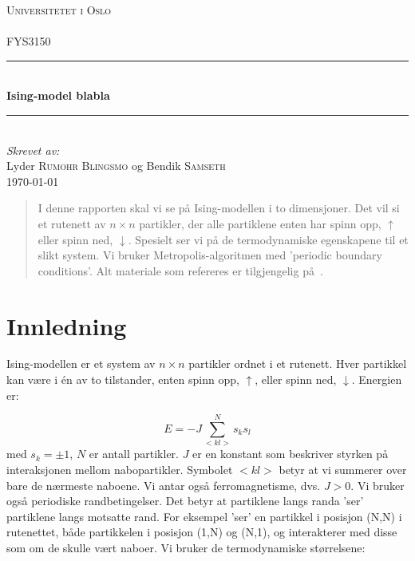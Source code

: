 \documentclass[11pt]{article}
\begin{document}
\begin{titlepage}
  \newcommand{\HRule}{\rule{\linewidth}{0.5mm}}
  \center
  \textsc{\LARGE Universitetet i Oslo}\\[1.5cm] %
  \textsc{\Large }\\[0.5cm] %
  \textsc{\large FYS3150}\\[0.5cm] %
  \HRule \\[0.4cm]
  { \huge \bfseries Ising-model blabla}\\[0.4cm]
  \HRule \\[1.5cm]
  \Large \emph{Skrevet av:}\\
  Lyder \textsc{Rumohr Blingsmo} og Bendik \textsc{Samseth}\\[3cm]
  {\large \today}\\[3cm]
  \vfill
\end{titlepage}

\begin{abstract}
I denne rapporten skal vi se på Ising-modellen i to dimensjoner. Det vil si
et rutenett av $n \times n $ partikler, der alle partiklene enten har
spinn opp, $\uparrow$ eller spinn ned, $\downarrow$. Spesielt ser vi
på de termodynamiske egenskapene til et slikt system. Vi bruker
Metropolis-algoritmen med 'periodic boundary conditions'. Alt materiale 
som refereres er tilgjengelig på~\cite{github-repo}. 
\end{abstract}

\section{Innledning}
\label{sec:innledning}
Ising-modellen er et system av $n \times n$ partikler ordnet i et rutenett. 
Hver partikkel kan være i én av to tilstander, enten spinn opp, $\uparrow$,
eller spinn ned, $\downarrow$. Energien er: 

\begin{equation}
  E=-J\sum_{<kl>}^{N}s_ks_l\label{eq:energi}
\end{equation}
med  $s_k=\pm 1$, $N$ er antall partikler.
$J$ er en konstant som beskriver styrken på interaksjonen mellom
nabopartikler. Symbolet $<kl>$ betyr at vi summerer over bare de
nærmeste naboene. Vi antar også  ferromagnetisme, dvs.  $J> 0$. Vi bruker også
periodiske randbetingelser. Det betyr at partiklene langs randa 'ser' 
partiklene langs motsatte rand. For eksempel 'ser' en partikkel i posisjon
(N,N) i rutenettet, både partikkelen i posisjon (1,N) og (N,1), og interakterer
med disse som om de skulle vært naboer. Vi bruker de termodynamiske størrelsene:
\end{document}
